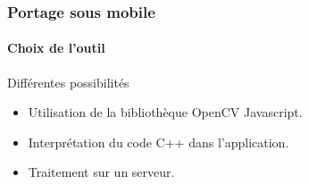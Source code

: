         \begin{frame}
            \frametitle{Portage sous mobile}
            \framesubtitle{Choix de l'outil}
            \begin{block}{Différentes possibilités}
                \begin{itemize}
                    \item Utilisation de la bibliothèque OpenCV Javascript.
                    \item Interprétation du code C++ dans l'application.
                    \item Traitement sur un serveur.
                \end{itemize}
            \end{block}
        \end{frame}

